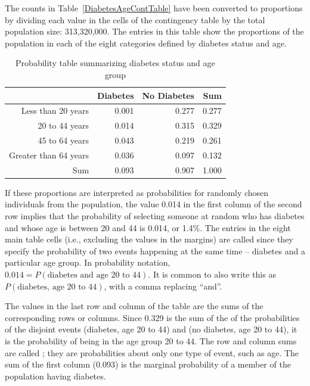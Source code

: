 The counts in Table~\ref{DiabetesAgeContTable} have been converted to proportions by dividing each value in the cells of the contingency table by the total population size: 313,320,000. The entries in this table show the proportions of the population in each of the eight categories defined by diabetes status and age. 


\begin{table}[ht]
	\centering
	\begin{tabular}{rrrr}
		\hline
		& Diabetes & No Diabetes & Sum \\ 
		\hline
		Less than 20 years & 0.001 & 0.277 & 0.277 \\ 
		20 to 44 years & 0.014 & 0.315 & 0.329 \\ 
		45 to 64 years & 0.043 & 0.219 & 0.261 \\ 
		Greater than 64 years & 0.036 & 0.097 & 0.132 \\ 
		Sum & 0.093 & 0.907 & 1.000 \\ 
		\hline
	\end{tabular}
	\caption{Probability table summarizing diabetes status and age group}
	\label{DiabetesAgeProbTable}
\end{table}

If these proportions are interpreted as probabilities for randomly chosen individuals from the population, the value 0.014 in the first column of the second row implies that the probability of selecting someone at random who has diabetes and whose age is between 20 and 44 is 0.014, or 1.4\%. The entries in the eight main table cells (i.e., excluding the values in the margins) are called  since they specify the probability of two events happening at the same time -- diabetes and a particular age group. In probability notation, $0.014 = P(\text{diabetes and age 20 to 44})$. It is common to also write this as $P(\text{diabetes, age 20 to 44})$, with a comma replacing ``and''.

The values in the last row and column of the table are the sums of the corresponding rows or columns. Since 0.329 is the sum of the of the probabilities of the disjoint events (diabetes, age 20 to 44) and (no diabetes, age 20 to 44), it is the probability of being in the age group 20 to 44. The row and column sums are called ; they are probabilities about only one type of event, such as age. The sum of the first column (0.093) is the marginal probability of a member of the population having diabetes.

